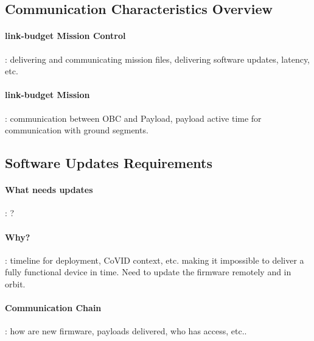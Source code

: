 \subsection{Communication Characteristics Overview}
\paragraph*{link-budget Mission Control}: delivering and communicating mission
files, delivering software updates, latency, etc.
\paragraph*{link-budget Mission}: communication between OBC and Payload, payload
active time for communication with ground segments.

\subsection{Software Updates Requirements}
\paragraph*{What needs updates}: ?
\paragraph*{Why?}: timeline for deployment, CoVID context, etc. making it impossible
to deliver a fully functional device in time. Need to update the firmware remotely
and in orbit.
\paragraph*{Communication Chain}: how are new firmware, payloads delivered,
who has access, etc..

